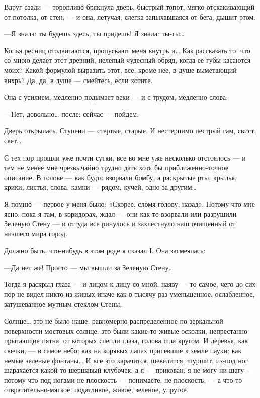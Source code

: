 \documentclass[11pt,openany]{book}
\begin{document}
Вдруг сзади --- торопливо брякнула дверь, быстрый топот, мягко отскакивающий от потолка, от стен, --- и она, летучая, слегка запыхавшаяся от бега, дышит ртом.

---Я знала: ты будешь здесь, ты придешь! Я знала: ты-ты\ldots{}

Копья ресниц отодвигаются, пропускают меня внутрь и\ldots{} Как рассказать то, что со мною делает этот древний, нелепый чудесный обряд, когда ее губы касаются моих? Какой формулой выразить этот, все, кроме нее, в душе выметающий вихрь? Да, да, в душе --- смейтесь, если хотите.

Она с усилием, медленно подымает веки --- и с трудом, медленно слова:

---Нет, довольно\ldots{} после: сейчас --- пойдем.

Дверь открылась. Ступени --- стертые, старые. И нестерпимо пестрый гам, свист, свет\ldots{}

С тех пор прошли уже почти сутки, все во мне уже несколько отстоялось --- и тем не менее мне чрезвычайно трудно дать хотя бы приближенно-точное описание. В голове --- как будто взорвали бомбу, а раскрытые рты, крылья, крики, листья, слова, камни --- рядом, кучей, одно за другим\ldots{}

Я помню --- первое у меня было: «Скорее, сломя голову, назад». Потому что мне ясно: пока я там, в коридорах, ждал --- они как-то взорвали или разрушили Зеленую Стену --- и оттуда все ринулось и захлестнуло наш очищенный от низшего мира город.

Должно быть, что-нибудь в этом роде я сказал I. Она засмеялась:

---Да нет же! Просто --- мы вышли за Зеленую Стену\ldots{}

Тогда я раскрыл глаза --- и лицом к лицу со мной, наяву --- то самое, чего до сих пор не видел никто из живых иначе как в тысячу раз уменьшенное, ослабленное, затушеванное мутным стеклом Стены.

Солнце\ldots{} это не было наше, равномерно распределенное по зеркальной поверхности мостовых солнце: это были какие-то живые осколки, непрестанно прыгающие пятна, от которых слепли глаза, голова шла кругом. И деревья, как свечки, --- в самое небо; как на корявых лапах присевшие к земле пауки; как немые зеленые фонтаны\ldots{} И все это карачится, шевелится, шуршит, из-под ног шарахается какой-то шершавый клубочек, а я --- прикован, я не могу ни шагу --- потому что под ногами не плоскость --- понимаете, не плоскость, --- а что-то отвратительно-мягкое, податливое, живое, зеленое, упругое.
\end{document}
